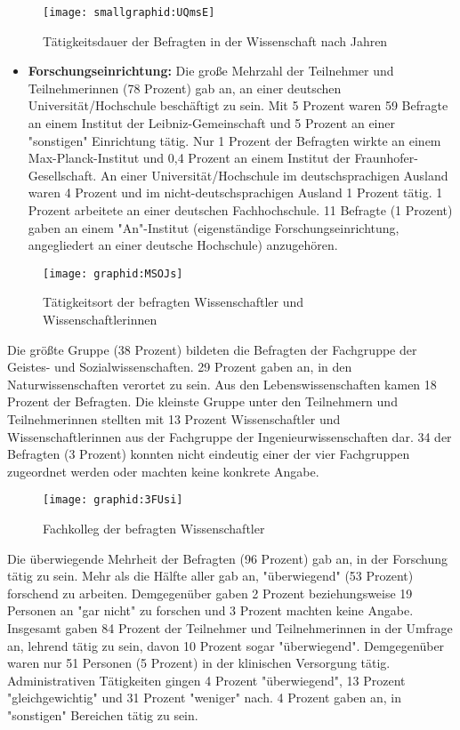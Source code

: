 \begin{figure}[h!]
\texttt{[image: smallgraphid:UQmsE]}
\caption{Tätigkeitsdauer der Befragten in der Wissenschaft nach Jahren}
\end{figure}

\begin{itemize}
\item \textbf{Forschungseinrichtung:} Die große Mehrzahl der Teilnehmer und Teilnehmerinnen (78 Prozent) gab an, an einer deutschen Universität/Hochschule beschäftigt zu sein. Mit 5 Prozent waren 59 Befragte an einem Institut der Leibniz-Gemeinschaft und 5 Prozent an einer "sonstigen" Einrichtung tätig. Nur 1 Prozent der Befragten wirkte an einem Max-Planck-Institut und 0,4 Prozent an einem Institut der Fraunhofer-Gesellschaft. An einer Universität/Hochschule im deutschsprachigen Ausland waren 4 Prozent und im nicht-deutschsprachigen Ausland 1 Prozent tätig. 1 Prozent arbeitete an einer deutschen Fachhochschule. 11 Befragte (1 Prozent) gaben an einem "An"-Institut (eigenständige Forschungseinrichtung, angegliedert an einer deutsche Hochschule) anzugehören.
\end{itemize}

\begin{figure}[h!]
\texttt{[image: graphid:MSOJs]}
\caption{Tätigkeitsort der befragten Wissenschaftler und Wissenschaftlerinnen}
\end{figure}

Die größte Gruppe (38 Prozent) bildeten die Befragten der Fachgruppe der Geistes- und Sozialwissenschaften. 29 Prozent gaben an, in den Naturwissenschaften verortet zu sein. Aus den Lebenswissenschaften kamen 18 Prozent der Befragten. Die kleinste Gruppe unter den Teilnehmern und Teilnehmerinnen stellten mit 13 Prozent Wissenschaftler und Wissenschaftlerinnen aus der Fachgruppe der Ingenieurwissenschaften dar. 34 der Befragten (3 Prozent) konnten nicht eindeutig einer der vier Fachgruppen zugeordnet werden oder machten keine konkrete Angabe.

\begin{figure}[h!]
\texttt{[image: graphid:3FUsi]}
\caption{Fachkolleg der befragten Wissenschaftler}
\end{figure}

Die überwiegende Mehrheit der Befragten (96 Prozent) gab an, in der Forschung tätig zu sein. Mehr als die Hälfte aller gab an, "überwiegend" (53 Prozent) forschend zu arbeiten. Demgegenüber gaben 2 Prozent beziehungsweise 19 Personen an "gar nicht" zu forschen und 3 Prozent machten keine Angabe. Insgesamt gaben 84 Prozent der Teilnehmer und Teilnehmerinnen in der Umfrage an, lehrend tätig zu sein, davon 10 Prozent sogar "überwiegend". Demgegenüber waren nur 51 Personen (5 Prozent) in der klinischen Versorgung tätig. Administrativen Tätigkeiten gingen 4 Prozent "überwiegend", 13 Prozent "gleichgewichtig" und 31 Prozent "weniger" nach. 4 Prozent gaben an, in "sonstigen" Bereichen tätig zu sein.

